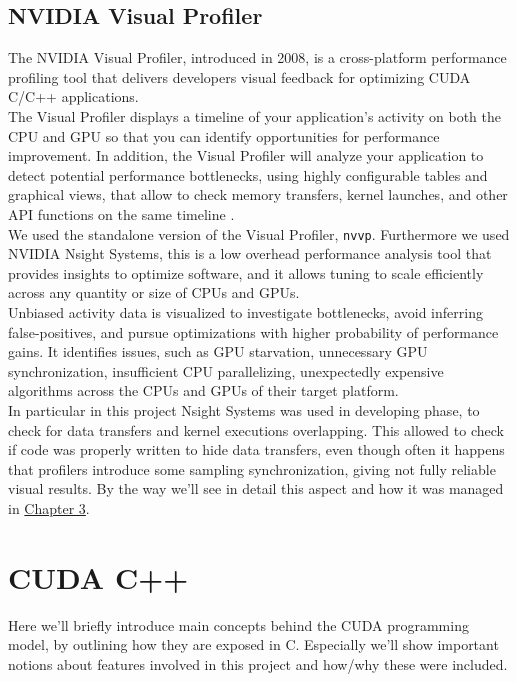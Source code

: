 	\subsection{NVIDIA Visual Profiler}
	The NVIDIA Visual Profiler, introduced in 2008, is a cross-platform performance profiling tool that delivers developers visual feedback for optimizing CUDA C/C++ applications.\\
	
	The Visual Profiler displays a timeline of your application's activity on both the CPU and GPU so that you can identify opportunities for performance improvement. In addition, the Visual Profiler will analyze your application to detect potential performance bottlenecks, using highly configurable tables and graphical views, that allow to check memory transfers, kernel launches, and other API functions on the same timeline \cite{profilersguide}.\\
	 
	 We used the standalone version of the Visual Profiler, \texttt{nvvp}. 
	 Furthermore we used NVIDIA Nsight Systems, this is a low overhead performance analysis tool that provides insights to optimize  software, and it allows tuning to scale efficiently across any quantity or size of CPUs and GPUs.\\
	 
	 Unbiased activity data is visualized to investigate bottlenecks, avoid inferring false-positives, and pursue optimizations with higher probability of performance gains. It identifies issues, such as GPU starvation, unnecessary GPU synchronization, insufficient CPU parallelizing, unexpectedly expensive algorithms across the CPUs and GPUs of their target platform. \\
	 
	In particular in this project Nsight Systems was used in developing phase, to check for data transfers and kernel executions overlapping.
	This allowed to check if code was properly written to hide data transfers, even though often it happens that profilers introduce some sampling synchronization, giving not fully reliable visual results.
	By the way we'll see in detail this aspect and how it was managed in \hyperref[chap:logic]{Chapter 3}.
	 
\section{CUDA C++}
	Here we'll briefly introduce main concepts behind the CUDA programming model, by outlining how they are exposed in C.
	Especially we'll show important notions about features involved in this project and how/why these were included.

